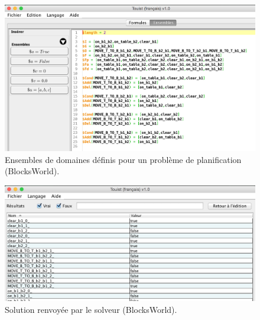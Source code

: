 \documentclass{jfpda2014}
\begin{document}
   \begin{figure}[!ht]
    \centering 
     \includegraphics[scale = 0.3]{images/touist_sets.png}    
    \caption{Ensembles de domaines définis pour un problème de planification (BlocksWorld).}%
    \label{fig:touist-sets}%
  \end{figure}


   \begin{figure}[!ht]
    \centering 
     \includegraphics[scale = 0.3]{images/touist_result.png}    
    \caption{Solution renvoyée par le solveur (BlocksWorld).}%
    \label{fig:touist-result}%
  \end{figure}
\end{document}
